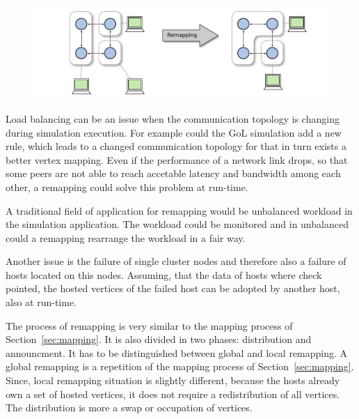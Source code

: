 \begin{figure}[H]
  \centering \includegraphics[width=\textwidth]{graphics/30_gvon_remapping}
  \caption{}
  \label{fig:gvon_remapping}
\end{figure}

Load balancing can be an issue when the communication topology is
changing during simulation execution. For example could the GoL
simulation add a new rule, which leads to a changed communication
topology for that in turn exists a better vertex mapping.  Even if the
performance of a network link drops, so that some peers are not able
to reach accetable latency and bandwidth among each other, a
remapping could solve this problem at run-time.

A traditional field of application for remapping would be unbalanced
workload in the simulation application. The workload could be
monitored and in unbalanced could a remapping rearrange the workload
in a fair way.

Another issue is the failure of single cluster nodes and therefore
also a failure of hosts located on this nodes. Assuming, that the data
of hosts where check pointed, the hosted vertices of the failed host
can be adopted by another host, also at run-time.

The process of remapping is very similar to the mapping process of
Section~\ref{sec:mapping}.  It is also divided in two phases:
distribution and announcment. It has to be distinguished between
global and local remapping. A global remapping is a repetition of the
mapping process of Section~\ref{sec:mapping}.  Since, local remapping
situation is slightly different, because the hosts already own a set
of hosted vertices, it does not require a redistribution of all
vertices.  The distribution is more a swap or occupation of vertices.

\cleardoublepage

